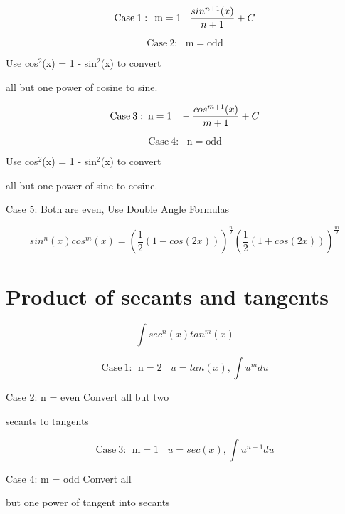 \documentclass{article}
\begin{document}
\begin{multicols}{2}

$$ \mathrm{Case \: 1: \: \: m = 1} \hspace{3mm}\frac{sin^{n+1}(x)}{n+1} + C $$ 

$$\mathrm{Case \: 2: \: \: \: m = odd} $$ 

\centerline{Use cos$^2$(x) = 1 - sin$^2$(x) to convert} 

\centerline{all but one power of cosine to sine.}


\medskip{}

$$ \mathrm{Case \: 3: \:  n = 1} \hspace{3mm}- \frac{cos^{m+1}(x)}{m + 1} + C $$ 

$$\mathrm{Case \: 4: \: \: \: n = odd} $$ 


\centerline{Use cos$^2$(x) = 1 - sin$^2$(x) to convert}

\centerline{all but one power of sine to cosine.}

\medskip{}

\bigskip{}


\centerline{Case 5: Both are even, Use Double Angle Formulas}

$$sin^n(x) cos^m(x) = (\frac{1}{2}(1 - cos(2x)))^{\frac{n}{2}} (\frac{1}{2}(1 + cos(2x)))^{\frac{m}{2}}$$

\end{multicols}






\section{Product of secants and tangents}

$$ \int sec^n(x) tan^m(x) $$

\begin{multicols}{2}

$$ \mathrm{Case \: 1: \: \: n = 2} \: \: \: \: u = tan(x), \int u^m du$$
 
\centerline{Case 2: n = even \hspace{3mm} Convert all but two}
\centerline{secants to tangents}

$$ \mathrm{Case \: 3: \: \: m = 1} \: \: \: \: u = sec(x), \int u^{n-1} du$$

\centerline{Case 4: m = odd \hspace{3mm} Convert all }
\centerline{but one power of tangent into secants}

\bigskip{}

\end{multicols}
\end{document}
